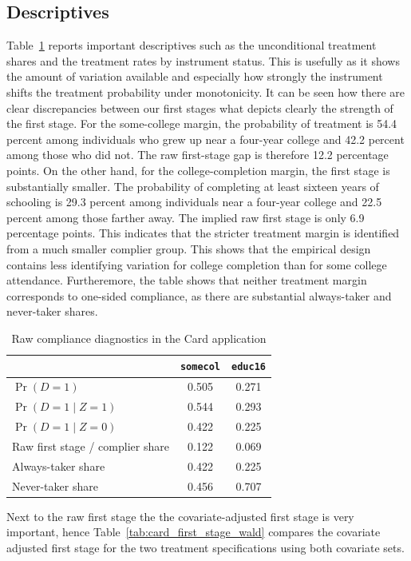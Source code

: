 \documentclass[12pt, a4paper, oneside]{article}
\theoremstyle{plain}
\theoremstyle{definition}
\begin{document}
\subsection{Descriptives}
Table~\ref{tab:card_compliance_raw} reports important descriptives such as the unconditional treatment shares and the treatment rates by instrument status. This is usefully as it shows the amount of variation available and especially how strongly the instrument shifts the treatment probability under monotonicity. It can be seen how there are clear discrepancies between our first stages what depicts clearly the strength of the first stage. For the some-college margin, the probability of treatment is 54.4 percent among individuals who grew up near a four-year college and 42.2 percent among those who did not.
The raw first-stage gap is therefore 12.2 percentage points.
On the other hand, for the college-completion margin, the first stage is substantially smaller. The probability of completing at least sixteen years of schooling is 29.3 percent among individuals near a four-year college and 22.5 percent among those farther away.
The implied raw first stage is only 6.9 percentage points. This indicates that the stricter treatment margin is identified from a much smaller complier group.
This shows that the empirical design contains less identifying variation for college completion than for some college attendance.
Furtheremore, the table shows that neither treatment margin corresponds to one-sided compliance, as there are substantial always-taker and never-taker shares.
\begin{table}[htbp]
\centering
\caption{Raw compliance diagnostics in the Card application}
\label{tab:card_compliance_raw}
\begin{tabular}{lcc}
\toprule
 & \texttt{somecol} & \texttt{educ16} \\
\midrule
$\Pr(D=1)$                         & 0.505 & 0.271 \\
$\Pr(D=1 \mid Z=1)$                & 0.544 & 0.293 \\
$\Pr(D=1 \mid Z=0)$                & 0.422 & 0.225 \\
Raw first stage / complier share   & 0.122 & 0.069 \\
Always-taker share                 & 0.422 & 0.225 \\
Never-taker share                  & 0.456 & 0.707 \\
\bottomrule
\end{tabular}
\end{table}
Next to the raw first stage the the covariate-adjusted first stage is very important, hence Table~\ref{tab:card_first_stage_wald} compares the covariate adjusted first stage for the two treatment specifications using both covariate sets.
\end{document}
